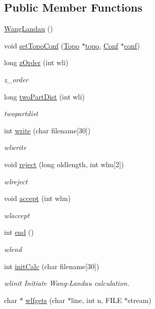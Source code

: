 \subsection*{Public Member Functions}
\begin{DoxyCompactItemize}
\item 
\hyperlink{class_wang_landau_ab53f526003716a3b44563e5d2e5bed30}{Wang\+Landau} ()
\item 
void \hyperlink{class_wang_landau_a7d5506109f6c750565616c08b726d9f9}{set\+Topo\+Conf} (\hyperlink{struct_topo}{Topo} $\ast$\hyperlink{class_wang_landau_a501fc7de450a2e78e5817331ec748517}{topo}, \hyperlink{class_conf}{Conf} $\ast$\hyperlink{class_wang_landau_acffd727c52c62ecf4bb12afbef005f91}{conf})
\item 
long \hyperlink{class_wang_landau_a4df29efa3a6199173058ffd12710c7e8}{z\+Order} (int wli)
\begin{DoxyCompactList}\small\item\em z\+\_\+order \end{DoxyCompactList}\item 
long \hyperlink{class_wang_landau_a14b34abee0916008aa263444926148e5}{two\+Part\+Dist} (int wli)
\begin{DoxyCompactList}\small\item\em twopartdist \end{DoxyCompactList}\item 
int \hyperlink{class_wang_landau_aa4f3858393f8cc34e0fb3f8274c4d742}{write} (char filename\mbox{[}30\mbox{]})
\begin{DoxyCompactList}\small\item\em wlwrite \end{DoxyCompactList}\item 
void \hyperlink{class_wang_landau_a66c79a6c8c0daa072426fa49476eca2f}{reject} (long oldlength, int wlm\mbox{[}2\mbox{]})
\begin{DoxyCompactList}\small\item\em wlreject \end{DoxyCompactList}\item 
void \hyperlink{class_wang_landau_a92b05d49c04b18f80a2532ced9e1ab5e}{accept} (int wlm)
\begin{DoxyCompactList}\small\item\em wlaccept \end{DoxyCompactList}\item 
int \hyperlink{class_wang_landau_a8ae98a180e7b4558de2a284e98c36f64}{end} ()
\begin{DoxyCompactList}\small\item\em wlend \end{DoxyCompactList}\item 
int \hyperlink{class_wang_landau_a4f96f435c69135fb5597cb708cb67ed5}{init\+Calc} (char filename\mbox{[}30\mbox{]})
\begin{DoxyCompactList}\small\item\em wlinit Initiate Wang-\/\+Landau calculation. \end{DoxyCompactList}\item 
char $\ast$ \hyperlink{class_wang_landau_a94ec92068a3d35b48a3dcb49e69cfbab}{wlfgets} (char $\ast$line, int n, F\+I\+L\+E $\ast$stream)
\end{DoxyCompactItemize}
